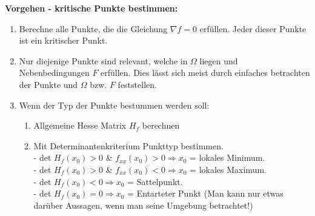 \textbf{Vorgehen - kritische Punkte bestimmen:} 
\begin{enumerate}[leftmargin=0.5cm]
	\item Berechne alle Punkte, die die Gleichung $\nabla f = 0$ erfüllen. Jeder dieser Punkte ist ein kritischer Punkt.

	\item Nur diejenige Punkte sind relevant, welche in $\Omega$ liegen und Nebenbedingungen $F$ erfüllen. Dies lässt sich meist durch einfaches betrachten der Punkte und $\Omega$ bzw. $F$ feststellen.

	\item Wenn der Typ der Punkte bestummen werden soll:
	\begin{enumerate}[leftmargin=0.3cm]
		\item Allgemeine Hesse Matrix $H_f$ berechnen

		\item Mit Determinantenkriterium Punkttyp bestimmen.\\
		- det $H_f(x_0) > 0$ \& $f_{xx}(x_0) > 0 \Rightarrow x_0$ = lokales Minimum.\\
		- det $H_f(x_0) > 0$ \& $f_{xx}(x_0) < 0 \Rightarrow x_0$ = lokales Maximum.\\
		- det $H_f(x_0) < 0 \Rightarrow x_0$ = Sattelpunkt.\\
		- det $H_f(x_0) = 0 \Rightarrow x_0$ = Entarteter Punkt (Man kann nur etwas darüber Aussagen, wenn man seine Umgebung betrachtet!)
	\end{enumerate}
\end{enumerate}

